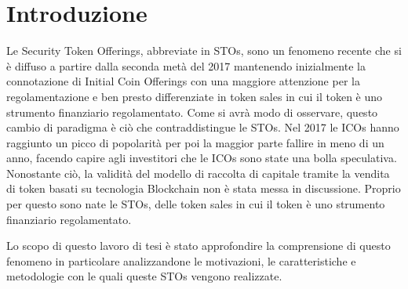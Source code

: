 \chapter*{Introduzione}                 %

Le Security Token Offerings, abbreviate in STOs, sono un fenomeno recente che si è diffuso a partire dalla seconda metà del 2017 mantenendo inizialmente la connotazione di Initial Coin Offerings con una maggiore attenzione per la regolamentazione e ben presto differenziate in token sales in cui il token è uno strumento finanziario regolamentato. 
Come si avrà modo di osservare, questo cambio di paradigma è ciò che contraddistingue le STOs. Nel 2017 le ICOs hanno raggiunto un picco di popolarità per poi la maggior parte fallire in meno di un anno, facendo capire agli investitori che le ICOs sono state una bolla speculativa. Nonostante ciò, la validità del modello di raccolta di capitale tramite la vendita di token basati su tecnologia Blockchain non è stata messa in discussione. Proprio per questo sono nate le STOs, delle token sales in cui il token è uno strumento finanziario regolamentato. 

Lo scopo di questo lavoro di tesi è stato approfondire la comprensione di questo fenomeno in particolare analizzandone le motivazioni, le caratteristiche e metodologie con le quali queste STOs vengono realizzate.

